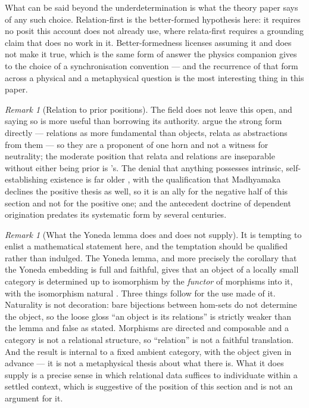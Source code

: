 \documentclass[11pt,a4paper]{article}
\theoremstyle{remark}\newtheorem{remark}[definition]{Remark}
\begin{document}
What can be said beyond the underdetermination is what the theory paper says of any such choice.
Relation-first is the better-formed hypothesis here: it requires no posit this account does not
already use, where relata-first requires a grounding claim that does no work in it. Better-formedness
licenses assuming it and does not make it true, which is the same form of answer the physics
companion gives to the choice of a synchronisation convention --- and the recurrence of that form
across a physical and a metaphysical question is the most interesting thing in this paper.

\begin{remark}[Relation to prior positions]\label{rem:relation-prior}
The field does not leave this open, and saying so is more useful than borrowing its authority.
\citet{ladymanross2007} argue the strong form directly --- relations as more fundamental than objects,
relata as abstractions from them --- so they are a proponent of one horn and not a witness for
neutrality; the moderate position that relata and relations are inseparable without either being
prior is \citet{esfeld2004}'s. The denial that anything possesses intrinsic, self-establishing
existence is far older \citep{nagarjuna1995}, with the qualification that Madhyamaka declines the
positive thesis as well, so it is an ally for the negative half of this section and not for the
positive one; and the antecedent doctrine of dependent origination predates its systematic form by
several centuries.
\end{remark}

\begin{remark}[What the Yoneda lemma does and does not supply]\label{rem:yoneda}
It is tempting to enlist a mathematical statement here, and the temptation should be qualified rather
than indulged. The Yoneda lemma, and more precisely the corollary that the Yoneda embedding is full
and faithful, gives that an object of a locally small category is determined up to isomorphism by the
\emph{functor} of morphisms into it, with the isomorphism natural \citep[\S III.2]{maclane1971}. Three
things follow for the use made of it. Naturality is not decoration: bare bijections between hom-sets
do not determine the object, so the loose gloss ``an object is its relations'' is strictly weaker
than the lemma and false as stated. Morphisms are directed and composable and a category is not a
relational structure, so ``relation'' is not a faithful translation. And the result is internal to a
fixed ambient category, with the object given in advance --- it is not a metaphysical thesis about
what there is. What it does supply is a precise sense in which relational data suffices to
individuate within a settled context, which is suggestive of the position of this section and is not
an argument for it.
\end{remark}
\end{document}
